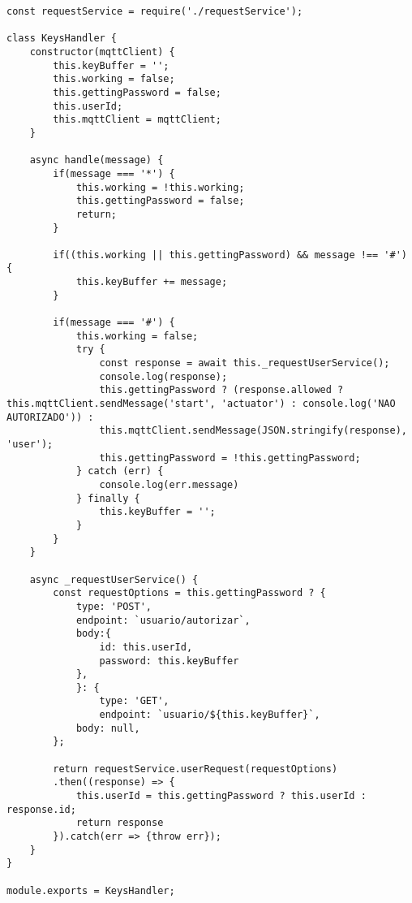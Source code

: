 \begin{lstlisting}[caption=Exemplo do código que lida com a comunicação com o InfluxDB]
const requestService = require('./requestService');

class KeysHandler {
	constructor(mqttClient) {
		this.keyBuffer = '';
		this.working = false;
		this.gettingPassword = false;
		this.userId;
		this.mqttClient = mqttClient;
	}
	
	async handle(message) {
		if(message === '*') {
			this.working = !this.working;
			this.gettingPassword = false;
			return;
		}
	
		if((this.working || this.gettingPassword) && message !== '#') {
			this.keyBuffer += message;
		}
		
		if(message === '#') {
			this.working = false;
			try {
				const response = await this._requestUserService();
				console.log(response);
				this.gettingPassword ? (response.allowed ? this.mqttClient.sendMessage('start', 'actuator') : console.log('NAO AUTORIZADO')) : 
				this.mqttClient.sendMessage(JSON.stringify(response), 'user');
				this.gettingPassword = !this.gettingPassword;
			} catch (err) {
				console.log(err.message)
			} finally {
				this.keyBuffer = '';
			}
		}
	}
	
	async _requestUserService() {
		const requestOptions = this.gettingPassword ? {
			type: 'POST',
			endpoint: `usuario/autorizar`,
			body:{
				id: this.userId,
				password: this.keyBuffer
			},
			}: {
				type: 'GET',
				endpoint: `usuario/${this.keyBuffer}`,
			body: null,
		};
		
		return requestService.userRequest(requestOptions)
		.then((response) => {
			this.userId = this.gettingPassword ? this.userId : response.id;
			return response
		}).catch(err => {throw err});
	}
}

module.exports = KeysHandler;
\end{lstlisting}

